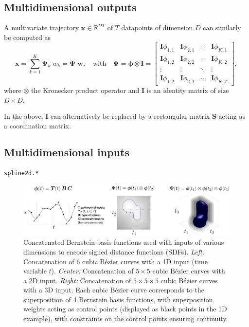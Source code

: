 \documentclass[10pt,a4paper]{article} %
\newcommand{\filename}[1]{\colorbox{rr2}{\color{white}\texttt{#1}}}
\begin{document}
\subsection{Multidimensional outputs}

A multivariate trajectory $\bm{x}\in\mathbb{R}^{DT}$ of $T$ datapoints of dimension $D$ can similarly be computed as
\begin{equation}
	\bm{x} = \sum_{k=1}^{K} \bm{\Psi}_{k} \; w_k = \bm{\Psi} \; \bm{w},
	\quad\text{with}\quad \bm{\Psi} = \bm{\phi} \otimes \bm{I} = \left[\begin{matrix}
	\bm{I}\phi_{1,1} & \bm{I}\phi_{2,1} & \cdots & \bm{I}\phi_{K,1} \\
	\bm{I}\phi_{1,2} & \bm{I}\phi_{2,2} & \cdots & \bm{I}\phi_{K,2} \\
	\vdots & \vdots & \ddots & \vdots \\
	\bm{I}\phi_{1,T} & \bm{I}\phi_{2,T} & \cdots & \bm{I}\phi_{K,T}  
	\end{matrix}\right], \label{eq:Psi}
\end{equation}
where $\otimes$ the Kronecker product operator and $\bm{I}$ is an identity matrix of size $D\times D$. 

In the above, $\bm{I}$ can alternatively be replaced by a rectangular matrix $\bm{S}$ acting as a coordination matrix. 


\subsection{Multidimensional inputs}
\begin{flushright}
\filename{spline2d.*}
\end{flushright}

\begin{figure}
\centering
\includegraphics[width=.66\textwidth]{images/Bezier_1D2D3D01.png}
\caption{\footnotesize
Concatenated Bernstein basis functions used with inputs of various dimensions to encode signed distance functions (SDFs). 
\emph{Left:} Concatenation of $6$ cubic Bézier curves with a 1D input (time variable $t$). 
\emph{Center:} Concatenation of $5\!\times\!5$ cubic Bézier curves with a 2D input. 
\emph{Right:} Concatenation of $5\!\times\!5\!\times\!5$ cubic Bézier curves with a 3D input.
Each cubic Bézier curve corresponds to the superposition of 4 Bernstein basis functions, with superposition weights acting as control points (displayed as black points in the 1D example), with constraints on the control points ensuring continuity.
}
\label{fig:Bezier_1D2D3D01}
\end{figure}
\end{document}
